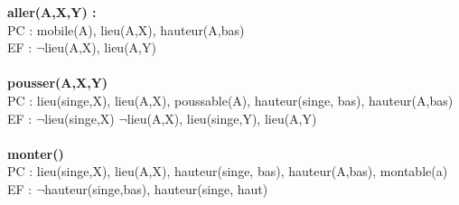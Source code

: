 \documentclass{article}
\begin{document}
\textbf{aller(A,X,Y) : }\\
PC : mobile(A), lieu(A,X), hauteur(A,bas)\\
EF : $\neg$lieu(A,X), lieu(A,Y)\\\\

\textbf{pousser(A,X,Y)}\\
PC : lieu(singe,X), lieu(A,X), poussable(A), hauteur(singe, bas), hauteur(A,bas)\\
EF : $\neg$lieu(singe,X) $\neg$lieu(A,X), lieu(singe,Y), lieu(A,Y)\\\\

\textbf{monter()}\\
PC : lieu(singe,X), lieu(A,X), hauteur(singe, bas), hauteur(A,bas), montable(a)\\
EF : $\neg$hauteur(singe,bas), hauteur(singe, haut)\\\\
\end{document}
